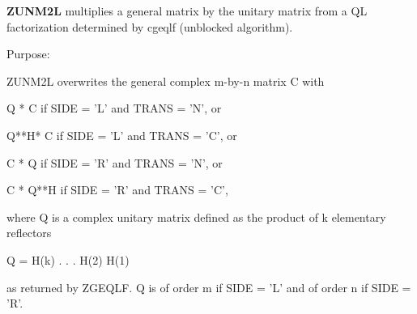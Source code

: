 {\bfseries Z\+U\+N\+M2\+L} multiplies a general matrix by the unitary matrix from a Q\+L factorization determined by cgeqlf (unblocked algorithm). 

 \begin{DoxyParagraph}{Purpose\+: }
\begin{DoxyVerb} ZUNM2L overwrites the general complex m-by-n matrix C with

       Q * C  if SIDE = 'L' and TRANS = 'N', or

       Q**H* C  if SIDE = 'L' and TRANS = 'C', or

       C * Q  if SIDE = 'R' and TRANS = 'N', or

       C * Q**H if SIDE = 'R' and TRANS = 'C',

 where Q is a complex unitary matrix defined as the product of k
 elementary reflectors

       Q = H(k) . . . H(2) H(1)

 as returned by ZGEQLF. Q is of order m if SIDE = 'L' and of order n
 if SIDE = 'R'.\end{DoxyVerb}
 
\end{DoxyParagraph}

